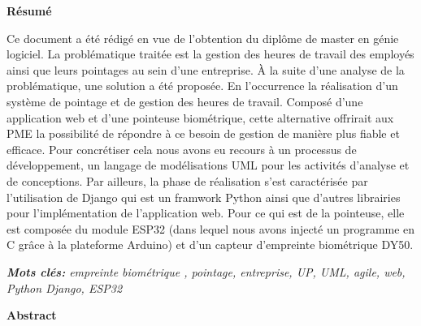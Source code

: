 \renewcommand{\headrulewidth}{0pt}
\fancyhead[R]{}

\begin{titlepage}
\newpage
\pagestyle{fancy}      
\lhead{}  
\chead{}     
\rhead{}     
    
\renewcommand{\headrulewidth}{0.5pt}

\begin{center}\huge{\textbf{Résumé}} \\ \end{center} 

Ce document a été rédigé en vue de l’obtention du diplôme de master en génie logiciel. La problématique traitée est la gestion des heures de travail des employés ainsi que leurs pointages au sein d’une entreprise. À la suite d’une analyse de la problématique, une solution a été proposée. En l’occurrence la réalisation d’un système de pointage et de gestion des heures de travail. Composé d’une application web et d’une pointeuse biométrique, cette alternative offrirait aux PME la possibilité de répondre à ce besoin de gestion de manière plus fiable et efficace. Pour concrétiser cela nous avons eu recours à un processus de développement, un langage de modélisations UML pour les activités d’analyse et de conceptions. Par ailleurs, la phase de réalisation s’est caractérisée par l’utilisation de Django qui est un framwork Python ainsi que d’autres librairies pour l’implémentation de l’application web. Pour ce qui est de la pointeuse, elle est composée du module ESP32 (dans lequel nous avons injecté un programme en C grâce à la plateforme Arduino) et d’un capteur d’empreinte biométrique DY50.  

\emph{\textbf{Mots clés:} empreinte biométrique , pointage, entreprise, UP, UML, agile, web, Python Django, ESP32}
\vspace{-20pt}
\begin{center}\huge{\textbf{Abstract}} \\ \end{center}


\end{titlepage}
